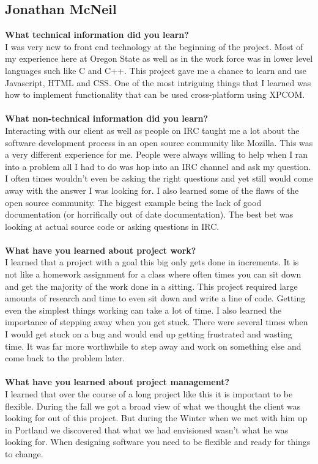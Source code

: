 \documentclass[12pt]{article}
\begin{document}
\subsection{Jonathan McNeil}
\textbf{What technical information did you learn?} \\
I was very new to front end technology at the beginning of the project.  Most of my experience here at Oregon State as well as
in the work force was in lower level languages such like C and C++. This project gave me a chance to learn and use Javascript, HTML and CSS.  One of the most intriguing things that I learned was how to implement functionality that can be used cross-platform using XPCOM. 
\\\\
\textbf{What non-technical information did you learn?}\\
Interacting with our client as well as people on IRC taught me a lot about the software development process in an open source community like Mozilla.  This was a very different experience for me.  People were always willing to help when I ran into a problem all I had to do was hop into an IRC channel and ask my question.  I often times wouldn't even be asking the right questions and yet still would come away with the answer I was looking for. I also learned some of the flaws of the open source community.  The biggest example being the lack of good documentation (or horrifically out of date documentation).  The best bet was looking at actual source code or asking questions in IRC.  
\\\\
\textbf{What have you learned about project work?}\\
I learned that a project with a goal this big only gets done in increments.  It is not
like a homework assignment for a class where often times you can sit down and get the majority of the work done 
in a sitting.  This project required large amounts of research and time to even sit down and write a line of code.  Getting even the simplest things working can take a lot of time. I also learned the importance of stepping away when you get stuck.  There were several times when I would get stuck on a bug and would end up getting frustrated and wasting time.  It was far more worthwhile to step away and work on something else and come back to the problem later. 
\\\\ 
\textbf{What have you learned about project management?}\\
I learned that over the course of a long project like this it is important to be flexible.  During the fall we got a broad view of what we thought the client was looking for out of this project. But during the Winter when we met with him up in Portland we discovered that what we had envisioned wasn't what he was looking for.  When designing software you need to be flexible and ready for things to change.
\end{document}
